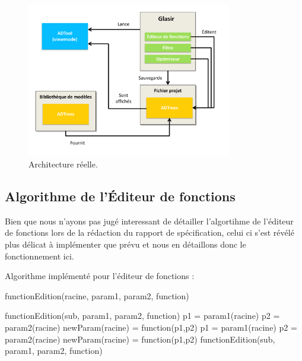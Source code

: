         
        \begin{figure}[H]
            \centering
                \includegraphics[width=0.8\textwidth]{figure/archiReelle.pdf}
            \caption{Architecture réelle.}
            \label{fig:archiReelle}
        \end{figure}
        
        
\subsection{Algorithme de l'Éditeur de fonctions}

Bien que nous n'ayons pas jugé interessant de détailler l'algortihme de l'éditeur de fonctions lors de la rédaction du rapport de spécification, celui ci s'est révélé plus délicat à implémenter que prévu et nous en détaillons donc le fonctionnement ici.

Algorithme implémenté pour l'éditeur de fonctions :

	\begin{algorithm}[h!]
            \caption{functionEdition(racine, param1, param2, function)}
            \label{algo:functionEdition}
            \begin{algorithmic}
				\STATE functionEdition(sub, param1, param2, function)
			\ENDFOR
			\RETURN
		\ENDIF
		\STATE
			\STATE p1 = param1(racine)
			\STATE p2 = param2(racine)
			\STATE newParam(racine) = function(p1,p2)
			\RETURN
		\ELSE
					\STATE p1 = param1(racine)
					\STATE p2 = param2(racine)
					\STATE newParam(racine) = function(p1,p2)
				\ENDIF
				\STATE functionEdition(sub, param1, param2, function)
			\ENDFOR
		\ENDIF
            \end{algorithmic}
        \end{algorithm}

